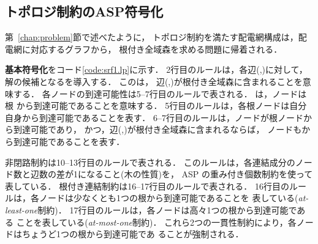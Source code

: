 \begin{itemize}
\end{itemize}


\subsection{トポロジ制約のASP符号化}\label{chap:topology}





第~\ref{chap:problem}節で述べたように，
トポロジ制約を満たす配電網構成は，配電網に対応するグラフから，
根付き全域森を求める問題に帰着される．

\textbf{基本符号化}をコード\ref{code:srf1.lp}に示す．
2行目のルールは，各辺(,)に対して，
解の候補となるを導入する．
このは，
辺(,)が根付き全域森に含まれることを意味する．
%
各ノードの到達可能性は5--7行目のルールで表される．
は，ノードは根
から到達可能であることを意味する．
5行目のルールは，各根ノードは自分自身から到達可能であることを表す．
6--7行目のルールは，ノードが根ノードから到達可能であり，
かつ，辺(,)が根付き全域森に含まれるならば，
ノードもから到達可能であることを表す．

非閉路制約は10--13行目のルールで表される．
このルールは，各連結成分のノード数と辺数の差が1になること(木の性質)を，
ASP の重み付き個数制約を使って表している．
%
根付き連結制約は16--17行目のルールで表される．
16行目のルールは，各ノードは少なくとも1つの根から到達可能であることを
表している(\textit{at-least-one}制約)．
17行目のルールは，各ノードは高々1つの根から到達可能である
ことを表している(\textit{at-most-one}制約)．
これら2つの一貫性制約により，各ノードはちょうど1つの根から到達可能であ
ることが強制される．

